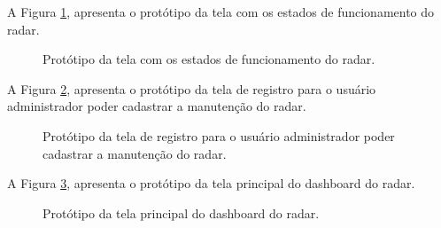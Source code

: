 A Figura \ref{fig:tela_status}, apresenta o protótipo da tela com os estados de funcionamento do radar.

\begin{figure}[H]
	\caption{\label{fig:tela_status} Protótipo da tela com os estados de funcionamento do radar.}
\end{figure}

A Figura \ref{fig:tela_registro}, apresenta o protótipo da tela de registro para o usuário administrador poder cadastrar a manutenção do radar.

\begin{figure}[H]
	\caption{\label{fig:tela_registro} Protótipo da tela de registro para o usuário administrador poder cadastrar a manutenção do radar.}
\end{figure}

A Figura \ref{fig:tela_dashboard}, apresenta o protótipo da tela principal do dashboard do radar.

\begin{figure}[H]
	\caption{\label{fig:tela_dashboard} Protótipo da tela principal do dashboard do radar.}
\end{figure}

